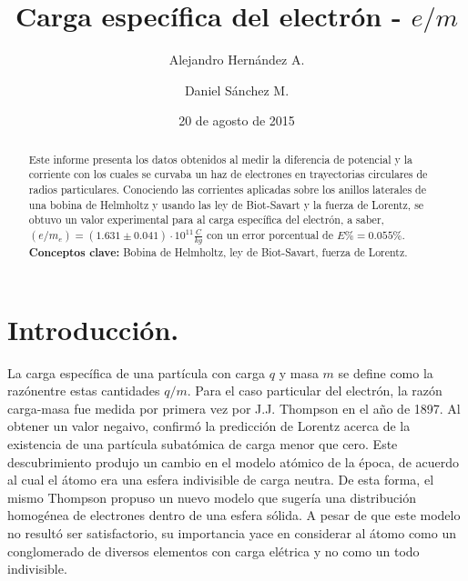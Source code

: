 \documentclass[prb,aps,twocolumn,preprintnumbers,amsmath,amssymb]{revtex4}
\begin{document}
\title{Carga específica del electrón - $e/m$}%

\author{Alejandro Hernández A.}%
\author{Daniel Sánchez M.}%
%
\date{20 de agosto de 2015\\}%

\begin{abstract}
Este informe presenta los datos obtenidos al medir la diferencia de potencial y la corriente con los cuales se curvaba un haz de electrones en trayectorias circulares de radios particulares. Conociendo las corrientes aplicadas sobre los anillos laterales de una bobina de Helmholtz y usando las ley de Biot-Savart y la fuerza de Lorentz, se obtuvo un valor experimental para al carga específica del electrón, a saber, $\left( e/m_{e} \right) = (1.631 \pm 0.041) \cdot 10^{11} \frac{C}{kg}$ con un error porcentual de  $E\% = 0.055\%$.
\\

\noindent \textbf{Conceptos clave:} Bobina de Helmholtz, ley de Biot-Savart, fuerza de Lorentz.
\end{abstract}
                             
\maketitle

\section{\label{sec:level1}Introducción.}

La carga específica de una partícula con carga $q$ y masa $m$ se define como la razónentre estas cantidades $q/m$. Para el caso particular del electrón, la razón carga-masa fue medida por primera vez por J.J. Thompson en el año de 1897. Al obtener un valor negaivo, confirmó la predicción de Lorentz acerca de la existencia de una partícula subatómica de carga menor que cero. Este descubrimiento produjo un cambio en el modelo atómico de la época, de acuerdo al cual el átomo era una esfera indivisible de carga neutra. De esta forma, el mismo Thompson propuso un nuevo modelo que sugería una distribución homogénea de electrones dentro de una esfera sólida. A pesar de que este modelo no resultó ser satisfactorio, su importancia yace en considerar al átomo como un conglomerado de diversos elementos con carga elétrica y no como un todo indivisible.\\
\end{document}
